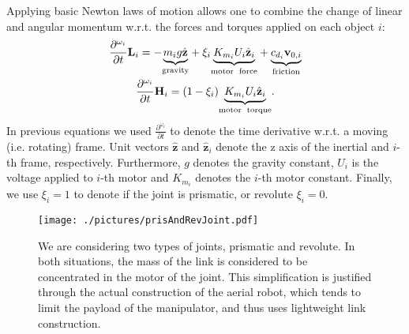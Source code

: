 Applying basic Newton laws of motion allows one to combine the change of linear and angular momentum w.r.t. the forces and torques applied on each object $i$:
\begin{gather}
\frac{\partial ^{\omega_i} }{\partial t }\textbf{L}_i = -\underset{\textup{gravity}}{\underbrace{m_i g \hat{\textbf{z}}}} + \xi_i \underset{\textup{motor\; force}}{\underbrace{K_{m_i} U_i \hat{\textbf{z}}_i}} +\underset{\textup{friction}}{\underbrace{ c_{d_i} \textbf{v}_{0,i}}} \\ \nonumber
\frac{\partial ^{\omega_i} }{\partial t }\textbf{H}_i = (1 - \xi_i)\underset{\textup{motor\; torque}}{\underbrace{ K_{m_i} U_i \hat{\textbf{z}}_i}}.
\end{gather}
In previous equations we used $\frac{\partial ^{\omega_i} }{\partial t }$ to denote the time derivative w.r.t. a moving (i.e. rotating) frame. Unit vectors $\hat{\textbf{z}}$ and $\hat{\textbf{z}}_i$ denote the z axis of the inertial and $i$-th frame, respectively. Furthermore, $g$ denotes the gravity constant, $U_i$ is the voltage applied to $i$-th motor and $K_{m_i}$ denotes the $i$-th motor constant. Finally, we use $\xi_i=1$ to denote if the joint is prismatic, or revolute $\xi_i=0$. 
\begin{figure}
	\centering
	\texttt{[image: ./pictures/prisAndRevJoint.pdf]}
	\caption{We are considering two types of joints, prismatic and revolute. In both situations, the mass of the link is considered to be concentrated in the motor of the joint. This simplification is justified through the actual construction of the aerial robot, which tends to limit the payload of the manipulator, and thus uses lightweight link construction.}
	\label{fig:prisAndRevJoint}
\end{figure}

